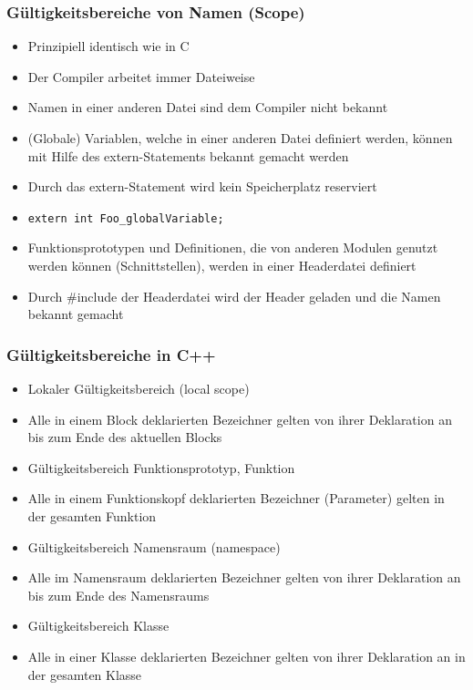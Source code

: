 \subsubsection{Gültigkeitsbereiche von Namen (Scope)\hfill}
\label{sec:unterunterabschnitt}
\begin{itemize}
	\item Prinzipiell identisch wie in C
	\item Der Compiler arbeitet immer Dateiweise
	\item Namen in einer anderen Datei sind dem Compiler nicht bekannt
	\item (Globale) Variablen, welche in einer anderen Datei definiert werden, können mit Hilfe des extern-Statements bekannt gemacht werden
	\item Durch das extern-Statement wird kein Speicherplatz reserviert
	\item[\-]
	\noindent
\begin{minipage}{\linewidth}
\begin{lstlisting}
extern int Foo_globalVariable;
\end{lstlisting}
\end{minipage}
	\item Funktionsprototypen und Definitionen, die von anderen Modulen genutzt werden können (Schnittstellen), werden in einer Headerdatei definiert
	\item Durch \#include der Headerdatei wird der Header geladen und die Namen bekannt gemacht
\end{itemize}

\subsubsection{Gültigkeitsbereiche in C++\hfill}
\label{secunterunterabschnitt}
\begin{itemize}
	\item Lokaler Gültigkeitsbereich (local scope)
	\item[\-] Alle in einem Block deklarierten Bezeichner gelten von ihrer Deklaration an bis zum Ende des aktuellen Blocks
	\item Gültigkeitsbereich Funktionsprototyp, Funktion
	\item[\-] Alle in einem Funktionskopf deklarierten Bezeichner (Parameter) gelten in der gesamten Funktion
	\item Gültigkeitsbereich Namensraum (namespace)
	\item[\-] Alle im Namensraum deklarierten Bezeichner gelten von ihrer Deklaration an bis zum Ende des Namensraums
	\item Gültigkeitsbereich Klasse
	\item[\-] Alle in einer Klasse deklarierten Bezeichner gelten von ihrer Deklaration an in der gesamten Klasse
\end{itemize}

